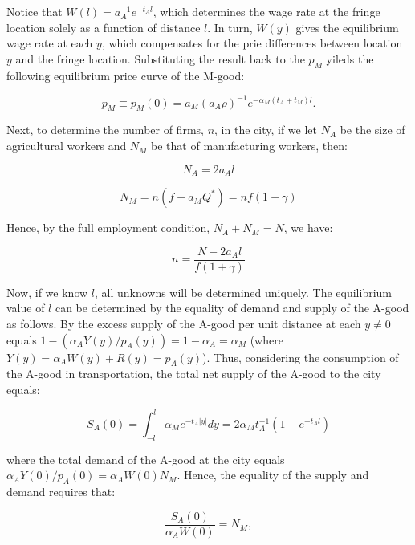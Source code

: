 Notice that $W(l) = a_A^{-1} e^{-t_A l}$, which determines the wage rate at the fringe location solely as a function of distance $l$. In turn, $W(y)$ gives the equilibrium wage rate at each $y$, which compensates for the prie differences between location $y$ and the fringe location. Substituting the result back to the $p_M$ yileds the following equilibrium price curve of the M-good:

\begin{equation}
  p_M \equiv p_M(0) = a_M (a_A \rho)^{-1} e^{-\alpha_M (t_A + t_M) l}.
\end{equation}

Next, to determine the number of firms, $n$, in the city, if we let $N_A$ be the size of agricultural workers and $N_M$ be that of manufacturing workers, then:

\begin{equation}
  N_A = 2a_A l
\end{equation}

\begin{equation}
  N_M = n(f + a_M Q^*) = nf(1 + \gamma)
\end{equation}

Hence, by the full employment condition, $N_A + N_M = N$, we have:

\begin{equation}
  n = \frac{N - 2a_A l}{f(1 + \gamma)}
\end{equation}

Now, if we know $l$, all unknowns will be determined uniquely. The equilibrium value of $l$ can be determined by the equality of demand and supply of the A-good as follows. By the excess supply of the A-good per unit distance at each $y \neq 0$ equals $1 - (\alpha_A Y(y) / p_A(y)) = 1 - \alpha_A = \alpha_M$ (where $Y(y) = \alpha_A W(y) + R(y) = p_A(y)$). Thus, considering the consumption of the A-good in transportation, the total net supply of the A-good to the city equals:

\begin{equation}
  S_A(0) = \int_{-l}^l \alpha_M e^{-t_A |y|} dy = 2\alpha_M t_A^{-1}(1 - e^{-t_A l})
\end{equation}

where the total demand of the A-good at the city equals $\alpha_A Y(0) / p_A(0) = \alpha_A W(0) N_M$. Hence, the equality of the supply and demand requires that:

\begin{equation}
  \frac{S_A(0)}{\alpha_A W(0)} = N_M,
\end{equation}

